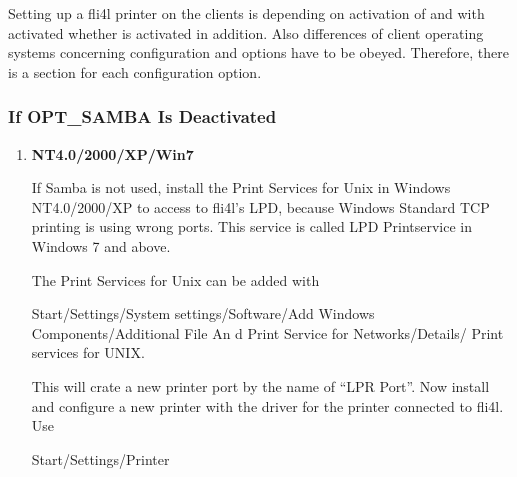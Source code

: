   Setting up a fli4l printer on the clients is depending on activation of
   and with activated
   whether 
  is activated in addition. Also differences of client operating systems
  concerning configuration and options have to be obeyed. Therefore,
  there is a section for each configuration option.

\subsubsection{If OPT\_SAMBA Is Deactivated}
\begin{enumerate}
\item \textbf{NT4.0/2000/XP/Win7}

  If Samba is not used, install the Print Services for Unix in Windows NT4.0/2000/XP
  to access to fli4l's LPD, because Windows Standard TCP printing is using wrong ports.
  This service is called LPD Printservice in Windows 7 and above.

  The Print Services for Unix can be added with

  Start/Settings/System settings/Software/Add Windows Components/Additional
  File An d Print Service for Networks/Details/
  Print services for UNIX.

  This will crate a new printer port by the name of ``LPR Port''. Now
  install and configure a new printer with the driver for the printer
  connected to fli4l. Use

  Start/Settings/Printer


\end{enumerate}
